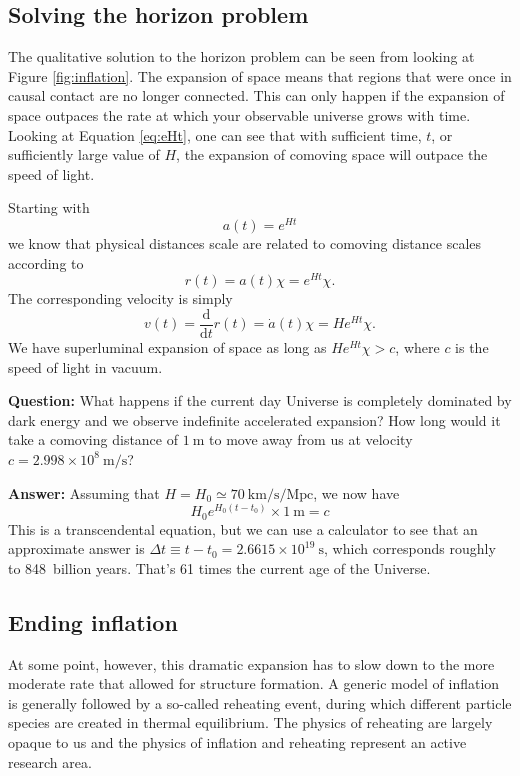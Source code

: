 \documentclass[a4paper,12pt]{article}
\theoremstyle{remark}
\newcommand{\mrm}[1]{\mathrm{#1}}
\renewcommand{\=}[1]{\stackrel{#1}{=}} %
\theoremstyle{plain}
\theoremstyle{definition}
\begin{document}
\subsection{Solving the horizon problem}
The qualitative solution to the horizon problem can be seen from looking at Figure \ref{fig:inflation}. The expansion of space means that regions that were once in causal contact are no longer connected. This can only happen if the expansion of space outpaces the rate at which your observable universe grows with time. Looking at Equation \ref{eq:eHt}, one can see that with sufficient time, $t$, or sufficiently large value of $H$, the expansion of comoving space will outpace the speed of light.

Starting with 
\begin{equation}
a(t) = e^{Ht}
\end{equation}
we know that physical distances scale are related to comoving distance scales according to
\begin{equation}
r(t) = a(t) \chi = e^{Ht} \chi.
\end{equation}
The corresponding velocity is simply
\begin{equation}
v(t) = \frac{\mrm{d} }{\mrm{d} t} r(t) = \dot{a} (t) \chi = H e^{Ht} \chi.
\end{equation}
We have superluminal expansion of space as long as $H e^{Ht} \chi > c$, where $c$ is the speed of light in vacuum.

\textbf{Question:} What happens if the current day Universe is completely dominated by dark energy and we observe indefinite accelerated expansion? How long would it take a comoving distance of $1\:\mrm{m}$ to move away from us at velocity $c = 2.998 \times 10^{8} \:\mrm{m/s}$? 

\textbf{Answer:} Assuming that $H = H_0 \simeq 70 \:\mrm{km/s/Mpc}$, we now have
\begin{equation}
H_0 e^{H_0 (t - t_0)} \times 1 \:\mrm{m} = c
\end{equation}
This is a transcendental equation, but we can use a calculator to see that an approximate answer is $\Delta t \equiv t - t_0 =  2.6615 \times 10^{19} \: \mrm{s}$, which corresponds roughly to 848~billion years. That's 61 times the current age of the Universe.

\subsection{Ending inflation}
At some point, however, this dramatic expansion has to slow down to the more moderate rate that allowed for structure formation. A generic model of inflation is generally followed by a so-called reheating event, during which different particle species are created in thermal equilibrium. The physics of reheating are largely opaque to us and the physics of inflation and reheating represent an active research area.
\end{document}
